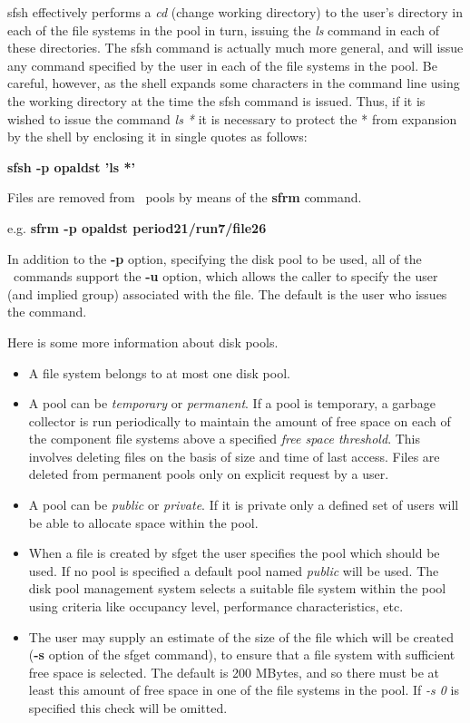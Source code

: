 sfsh effectively performs a {\it cd} (change working directory) to the user's
 directory
in each of the file systems in the pool in turn, issuing the {\it ls} command
in each of these directories. The sfsh command is actually much more general,
 and will
issue any command specified by the user in each of the file systems in the
pool. Be careful, however, as the shell expands some characters in the command
 line
using the working directory at the time the sfsh command is issued. Thus, if it
 is wished
to issue the command {\it ls *} it is necessary to protect the
* from expansion by the shell by enclosing it in single quotes as follows:
 
{\bf sfsh -p opaldst 'ls *'}
 
Files are removed from \shift\ pools by means of the {\bf sfrm} command.
 
e.g. {\bf sfrm -p opaldst period21/run7/file26}
 
In addition to the {\bf -p} option, specifying the disk pool to be used, all of
 the
\DPM\ commands support the {\bf -u} option, which allows the
caller to specify the user (and implied group) associated with the file. The
 default
is the user who issues the command.
 
Here is some more information about disk pools.
 
\begin{itemize}
\item A file system belongs to at most one disk pool.
\item A pool can be {\it temporary} or {\it permanent}.
If a pool is temporary, a garbage collector is run periodically
to maintain the amount of free space on each of the component
file systems above a specified {\it free space threshold}. This involves
deleting files on the basis of size and time of last access.
Files are deleted from permanent pools only
on explicit request by a user.
\item A pool can be {\it public} or {\it private}. If it is private only a
 defined set of
users
will be able to allocate space within the pool.
\item When a file is created by sfget the user specifies the pool which
should be used. If no pool is specified a default pool named {\it public} will
 be used.
The disk pool management system selects a suitable file system within the pool
 using
criteria like occupancy level, performance characteristics, etc.
\item The user may supply an estimate
of the size of the file which will be created ({\bf -s} option of the sfget
 command),
to ensure that a
file system with sufficient free space is selected. The default is
200 MBytes, and so
there must be at least this amount of free space in one of the file systems
in the pool. If {\it -s 0} is specified this check will be omitted.
\end{itemize}
 
